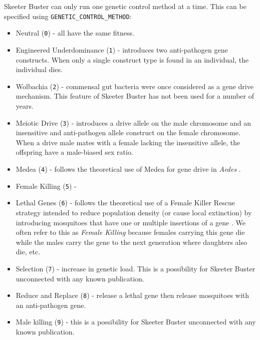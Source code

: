 \documentclass[11pt]{article}
\newcommand{\linecmd}[1]{\texttt{#1}}
\begin{document}
Skeeter Buster can only run one genetic control method at a time. This can be specified using \linecmd{GENETIC\_CONTROL\_METHOD}:
\begin{itemize}
	\item Neutral (\linecmd{0}) - all 
	 have the same fitness.
	\item Engineered Underdominance (\linecmd{1}) - introduces two anti-pathogen gene constructs. When only a single construct type is found in an individual, the individual dies.%
	\item Wolbachia (\linecmd{2}) - commensal gut bacteria were once considered as a gene drive mechanism. This feature of Skeeter Buster has not been used for a number of years.
	\item Meiotic Drive (\linecmd{3}) - introduces a drive allele on the male chromosome and an insensitive and anti-pathogen allele construct on the female chromosome. When a drive male mates with a female lacking the insensitive allele, the offspring have a male-biased sex ratio.
	\item Medea (\linecmd{4}) - follows the theoretical use of Medea for gene drive in \emph{Aedes} \cite{ward2011medea}.
	\item Female Killing (\linecmd{5}) - 
	\item Lethal Genes (\linecmd{6}) - follows the theoretical use of a Female Killer Rescue strategy intended to reduce population density (or cause local extinction) by introducing mosquitoes that have one or multiple insertions of a gene \cite{gould2008killer}. We often refer to this as \emph{Female Killing} because females carrying this gene die while the males carry the gene to the next generation where daughters also die, etc. %
	\item Selection (\linecmd{7}) - increase in genetic load. This is a possibility for Skeeter Buster unconnected with any known publication.
	\item Reduce and Replace (\linecmd{8}) - release a lethal gene then release mosquitoes with an anti-pathogen gene. %
	\item Male killing (\linecmd{9}) - this is a possibility for Skeeter Buster unconnected with any known publication.
\end{itemize}
\end{document}
